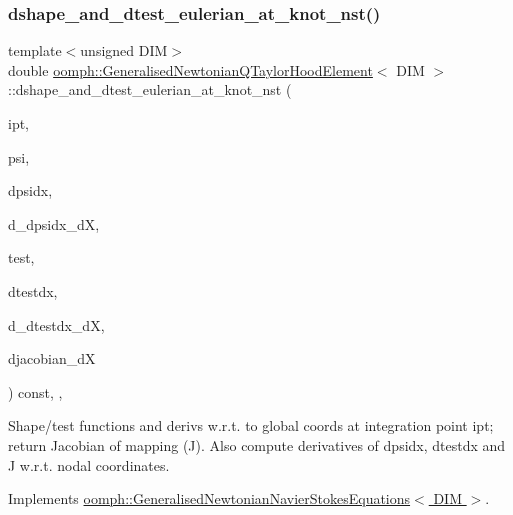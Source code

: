 \subsubsection{\texorpdfstring{dshape\+\_\+and\+\_\+dtest\+\_\+eulerian\+\_\+at\+\_\+knot\+\_\+nst()}{dshape\_and\_dtest\_eulerian\_at\_knot\_nst()}\hspace{0.1cm}{\footnotesize\ttfamily [2/4]}}
{\footnotesize\ttfamily template$<$unsigned D\+IM$>$ \\
double \hyperlink{classoomph_1_1GeneralisedNewtonianQTaylorHoodElement}{oomph\+::\+Generalised\+Newtonian\+Q\+Taylor\+Hood\+Element}$<$ D\+IM $>$\+::dshape\+\_\+and\+\_\+dtest\+\_\+eulerian\+\_\+at\+\_\+knot\+\_\+nst (\begin{DoxyParamCaption}\item[{const unsigned \&}]{ipt,  }\item[{\hyperlink{classoomph_1_1Shape}{Shape} \&}]{psi,  }\item[{\hyperlink{classoomph_1_1DShape}{D\+Shape} \&}]{dpsidx,  }\item[{\hyperlink{classoomph_1_1RankFourTensor}{Rank\+Four\+Tensor}$<$ double $>$ \&}]{d\+\_\+dpsidx\+\_\+dX,  }\item[{\hyperlink{classoomph_1_1Shape}{Shape} \&}]{test,  }\item[{\hyperlink{classoomph_1_1DShape}{D\+Shape} \&}]{dtestdx,  }\item[{\hyperlink{classoomph_1_1RankFourTensor}{Rank\+Four\+Tensor}$<$ double $>$ \&}]{d\+\_\+dtestdx\+\_\+dX,  }\item[{\hyperlink{classoomph_1_1DenseMatrix}{Dense\+Matrix}$<$ double $>$ \&}]{djacobian\+\_\+dX }\end{DoxyParamCaption}) const\hspace{0.3cm}{\ttfamily [inline]}, {\ttfamily [protected]}, {\ttfamily [virtual]}}



Shape/test functions and derivs w.\+r.\+t. to global coords at integration point ipt; return Jacobian of mapping (J). Also compute derivatives of dpsidx, dtestdx and J w.\+r.\+t. nodal coordinates. 



Implements \hyperlink{classoomph_1_1GeneralisedNewtonianNavierStokesEquations_a24a93b73dba66e04eabb9b37a9360daa}{oomph\+::\+Generalised\+Newtonian\+Navier\+Stokes\+Equations$<$ D\+I\+M $>$}.

\mbox{\label{classoomph_1_1GeneralisedNewtonianQTaylorHoodElement_a15e8e8fa9fb041edbdabb433faca1709}} 
